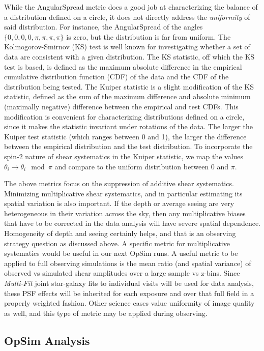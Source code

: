 While the AngularSpread metric does a good job at characterizing the balance of
a distribution defined on a circle, it does not directly address the {\emph
{uniformity}} of said distribution.  For instance, the AngularSpread of the
angles $\{0, 0, 0, 0, \pi, \pi, \pi, \pi\}$ is zero, but the distribution is far
from uniform.  The Kolmogorov-Smirnov (KS) test is well known for investigating
whether a set of data are consistent with a given distribution.  The KS
statistic, off which the KS test is based, is defined as the maximum absolute
difference in the empirical cumulative distribution function (CDF) of the data
and the CDF of the distribution being tested.  The Kuiper statistic is a slight
modification of the KS statistic, defined as the sum of the maximum difference
and absolute minimum (maximally negative) difference between the empirical and
test CDFs.  This modification is convenient for characterizing distributions
defined on a circle, since it makes the statistic invariant under rotations of
the data.  The larger the Kuiper test statistic (which ranges between 0 and 1),
the larger the difference between the empirical distribution and the test
distribution.  To incorporate the spin-2 nature of shear systematics in the
Kuiper statistic, we map the values $\theta_i \rightarrow \theta_i \mod \pi$ and
compare to the uniform distribution between 0 and $\pi$.

The above metrics focus on the suppression of additive shear systematics.
Minimizing multiplicative shear systematics, and in particular estimating its
spatial variation is also important.  If the depth or average seeing are very
heterogeneous in their variation across the sky, then any multiplicative biases
that have to be corrected in the data analysis will have severe spatial
dependence. Homogeneity of depth and seeing certainly helps, and that is an
observing strategy question as discussed above.  A specific metric for
multiplicative systematics would be useful in our next OpSim runs.  A useful
metric to be applied to full observing simulations is the mean ratio (and
spatial variance) of observed vs simulated shear amplitudes over a large sample
vs z-bins.  Since {\it Multi-Fit} joint star-galaxy fits to individual visits
will be used for data analysis, these PSF effects will be inherited for each
exposure and over that full field in a properly weighted fashion.  Other science
cases value uniformity of image quality as well, and this type of metric may be
applied during observing.


\subsection{OpSim Analysis}

